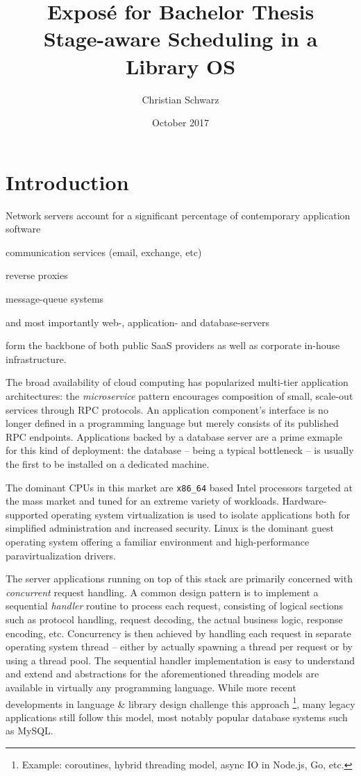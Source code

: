 \documentclass{article}
\title{{\large Exposé for Bachelor Thesis}\\Stage-aware Scheduling in a Library OS}
\author{Christian Schwarz}
\date{October 2017}
\begin{document}
\maketitle

\section{Introduction}

Network servers account for a significant percentage of contemporary application software%
\begin{itemize*}[label={}, before={{:}}, itemjoin={{,}}]
    \item communication services (email, exchange, etc)
    \item reverse proxies
    \item message-queue systems
    \item and most importantly web-, application- and database-servers
\end{itemize*}
form the backbone of both public SaaS providers as well as corporate in-house infrastructure. 

The broad availability of cloud computing has popularized multi-tier application architectures:
the \textit{microservice} pattern encourages composition of small, scale-out services through RPC protocols.
An application component's interface is no longer defined in a programming language but merely consists of its published
RPC endpoints.
Applications backed by a database server are a prime exmaple for this kind of deployment:
the database -- being a typical bottleneck -- is usually the first to be installed on a dedicated machine.

The dominant CPUs in this market are \texttt{x86\_64} based Intel processors targeted at the mass market and tuned for an
extreme variety of workloads.
Hardware-supported operating system virtualization is used to isolate applications both for simplified administration
and increased security.
Linux is the dominant guest operating system offering a familiar environment and high-performance paravirtualization drivers.

The server applications running on top of this stack are primarily concerned with \emph{concurrent} request handling.
A common design pattern is to implement a sequential \textit{handler} routine to process each request, consisting of
logical sections such as protocol handling, request decoding, the actual business logic, response encoding, etc.
Concurrency is then achieved by handling each request in separate operating system thread -- either
by actually spawning a thread per request or by using a thread pool.
The sequential handler implementation is easy to understand and extend and
abstractions for the aforementioned threading models are available in virtually any programming language.
While more recent developments in language \& library design challenge this approach
\footnote{Example: coroutines, hybrid threading model, async IO in Node.js, Go, etc.},
many legacy applications still follow this model, most notably popular database systems such as MySQL.
\end{document}
